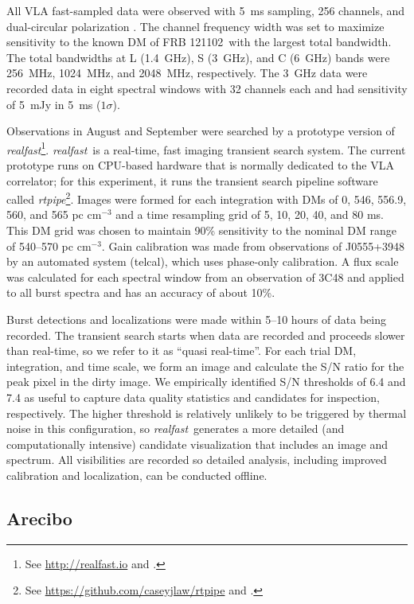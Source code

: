 \documentclass[twocolumn]{aastex61}
\newcommand{\rf}{\emph{realfast}}
\newcommand{\frb}{FRB 121102}
\begin{document}
All VLA fast-sampled data were observed with 5~ms sampling, 256 channels, and dual-circular polarization \citep{2015ApJ...807...16L}. The channel frequency width was set to maximize sensitivity to the known DM of \frb\ with the largest total bandwidth. The total bandwidths at L (1.4~GHz), S (3~GHz), and C (6~GHz) bands were 256~MHz, 1024~MHz, and 2048~MHz, respectively. The 3~GHz data were recorded data in eight spectral windows with 32 channels each and had sensitivity of 5~mJy in 5~ms ($1\sigma$).

Observations in August and September were searched by a prototype version of \rf\footnote{See \url{http://realfast.io} and \citep{2017AAS...22933002L}.}. \rf\ is a real-time, fast imaging transient search system. The current prototype runs on CPU-based hardware that is normally dedicated to the VLA correlator; for this experiment, it runs the transient search pipeline software called \emph{rtpipe}\footnote{See \url{https://github.com/caseyjlaw/rtpipe} and \citet{2015ApJ...807...16L}.}. Images were formed for each integration with DMs of 0, 546, 556.9, 560, and 565 pc cm$^{-3}$ and a time resampling grid of 5, 10, 20, 40, and 80 ms. This DM grid was chosen to maintain 90\% sensitivity to the nominal DM range of 540--570 pc cm$^{-3}$. Gain calibration was made from observations of J0555+3948 by an automated system (telcal), which uses phase-only calibration. A flux scale was calculated for each spectral window from an observation of 3C48 and applied to all burst spectra and has an accuracy of about 10\%.

Burst detections and localizations were made within 5--10 hours of data being recorded. The transient search starts when data are recorded and proceeds slower than real-time, so we refer to it as ``quasi real-time''. For each trial DM, integration, and time scale, we form an image and calculate the S/N ratio for the peak pixel in the dirty image. We empirically identified S/N thresholds of 6.4 and 7.4 as useful to capture data quality statistics and candidates for inspection, respectively. The higher threshold is relatively unlikely to be triggered by thermal noise in this configuration, so \rf\ generates a more detailed (and computationally intensive) candidate visualization that includes an image and spectrum. All visibilities are recorded so detailed analysis, including improved calibration and localization, can be conducted offline. 

\subsection{Arecibo}
\end{document}
